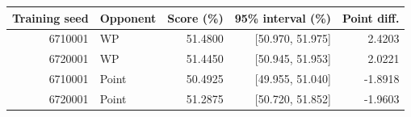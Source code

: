 \begin{tabular}{rlrrr}
\toprule
Training seed & Opponent & Score (\%) & 95\% interval (\%) & Point diff. \\
\midrule
6710001 & WP & 51.4800 & [50.970, 51.975] & 2.4203 \\
6720001 & WP & 51.4450 & [50.945, 51.953] & 2.0221 \\
6710001 & Point & 50.4925 & [49.955, 51.040] & -1.8918 \\
6720001 & Point & 51.2875 & [50.720, 51.852] & -1.9603 \\
\bottomrule
\end{tabular}
